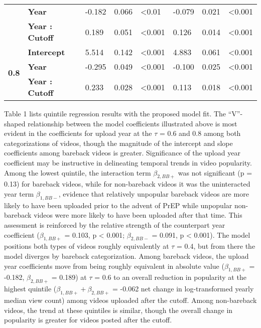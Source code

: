 \documentclass[]{article}
\begin{document}
\begin{table}[]
\begin{tabular}{@{}l|l|lll|lll@{}}
                              & \textbf{Year}          & -0.182         & 0.066       & \textless 0.01               & -0.079         & 0.021       & \textless 0.001              \\
                              & \textbf{Year : Cutoff} & 0.189          & 0.051       & \textless 0.001              & 0.126          & 0.014       & \textless 0.001              \\ \midrule
\multirow{3}{*}{\textbf{0.8}} & \textbf{Intercept}     & 5.514          & 0.142       & \textless 0.001              & 4.883          & 0.061       & \textless 0.001              \\
                              & \textbf{Year}          & -0.295         & 0.049       & \textless 0.001              & -0.100         & 0.025       & \textless 0.001              \\
                              & \textbf{Year : Cutoff} & 0.233          & 0.028       & \textless 0.001              & 0.113          & 0.018       & \textless 0.001              \\ \bottomrule
\end{tabular}
\end{table}

Table 1 lists quintile regression results with the proposed model fit.
The ``V''-shaped relationship between the model coefficients illustrated
above is most evident in the coefficients for upload year at the
\(\tau\) = 0.6 and 0.8 among both categorizations of videos, though the
magnitude of the intercept and slope coefficients among bareback videos
is greater. Significance of the upload year coefficient may be
instructive in delineating temporal trends in video popularity. Among
the lowest quintile, the interaction term \(\beta _{2, BB+}\) was not
significant (p = 0.13) for bareback videos, while for non-bareback
videos it was the uninteracted year term \(\beta _{1, BB-}\), evidence
that relatively unpopular bareback videos are more likely to have been
uploaded prior to the advent of PrEP while unpopular non-bareback videos
were more likely to have been uploaded after that time. This assessment
is reinforced by the relative strength of the counterpart year
coefficient (\(\beta _{1, BB+}\) = 0.103, p \textless{} 0.001;
\(\beta _{2, BB-}\) = 0.091, p \textless{} 0.001). The model positions
both types of videos roughly equivalently at \(\tau\) = 0.4, but from
there the model diverges by bareback categorization. Among bareback
videos, the upload year coefficients move from being roughly equivalent
in absolute value (\(\beta _{1, BB+}\) = -0.182, \(\beta _{2, BB+}\) =
0.189) at \(\tau\) = 0.6 to an overall reduction in popularity at the
highest quintile (\(\beta _{1, BB+} + \beta _{2, BB+}\) = -0.062 net
change in log-transformed yearly median view count) among videos
uploaded after the cutoff. Among non-bareback videos, the trend at these
quintiles is similar, though the overall change in popularity is greater
for videos posted after the cutoff.
\end{document}
